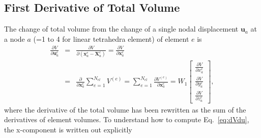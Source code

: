 \documentclass[12pt,aps,pre]{revtex4}
\begin{document}
\subsection{First Derivative of Total Volume}

The change of total volume from the change of a single nodal displacement $\pmb{u}_a$ at a node $a$ (=1 to 4 for linear tetrahedra element) of element $e$ is
%
\begin{eqnarray}
\frac{\partial V}{\partial \pmb{u}_a^e} &=& \frac{\partial V}{\partial (\pmb{x}_a^e-\pmb{X}_a^e)} = \frac{\partial V}{\partial \pmb{x}_a^e} \nonumber\\
&=& \frac{\partial}{\partial \pmb{x}_a^e} \sum_{e=1}^{N_{el}}V^{(e)} = \sum_{e=1}^{N_{el}}\frac{\partial V^{(e)}}{\partial \pmb{x}_a^e}
= W_1\begin{bmatrix}
\frac{\partial V}{\partial x_a^e} \\ \frac{\partial V}{\partial y_a^e} \\ \frac{\partial V}{\partial z_a^e}
\end{bmatrix},
\label{eq:dVdu}
\end{eqnarray}
%
where the derivative of the total volume has been rewritten as the sum of the derivatives of element volumes. To understand how to compute Eq.\ \eqref{eq:dVdu}, the x-component is written out explicitly
%
\end{document}
